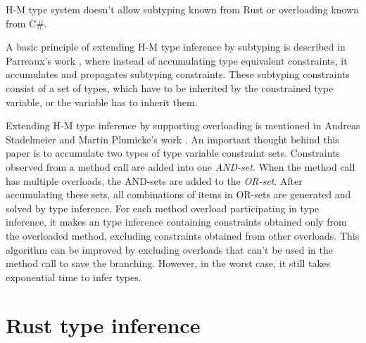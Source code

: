H-M type system doesn't allow subtyping known from Rust or overloading known from C\#.  
\par
A basic principle of extending H-M type inference by subtyping is described in Parreaux's work \cite{paper:Parreaux}, where instead of accumulating type equivalent constraints, it accumulates and propagates subtyping constraints.
These subtyping constraints consist of a set of types, which have to be inherited by the constrained type variable, or the variable has to inherit them.
\par
Extending H-M type inference by supporting overloading is mentioned in Andreas Stadelmeier and Martin Plumicke's work \cite{paper:Overloading}.
An important thought behind this paper is to accumulate two types of type variable constraint sets.
Constraints observed from a method call are added into one \textit{AND-set}.
When the method call has multiple overloads, the AND-sets are added to the \textit{OR-set}.
After accumulating these sets, all combinations of items in OR-sets are generated and solved by type inference.
For each method overload participating in type inference, it makes an type inference containing constraints obtained only from the overloaded method, excluding constraints obtained from other overloads.
This algorithm can be improved by excluding overloads that can't be used in the method call to save the branching.
However, in the worst case, it still takes exponential time to infer types.

\section{Rust type inference}

